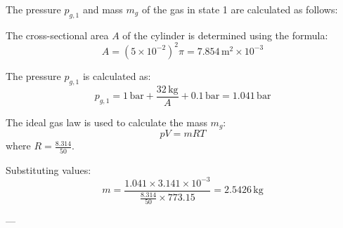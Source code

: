 The pressure \( p_{g,1} \) and mass \( m_g \) of the gas in state 1 are calculated as follows:  

The cross-sectional area \( A \) of the cylinder is determined using the formula:  
\[
A = (5 \times 10^{-2})^2 \pi = 7.854 \, \text{m}^2 \times 10^{-3}
\]  

The pressure \( p_{g,1} \) is calculated as:  
\[
p_{g,1} = 1 \, \text{bar} + \frac{32 \, \text{kg}}{A} + 0.1 \, \text{bar} = 1.041 \, \text{bar}
\]  

The ideal gas law is used to calculate the mass \( m_g \):  
\[
pV = mRT
\]  
where \( R = \frac{8.314}{50} \).  

Substituting values:  
\[
m = \frac{1.041 \times 3.141 \times 10^{-3}}{\frac{8.314}{50} \times 773.15} = 2.5426 \, \text{kg}
\]  

---